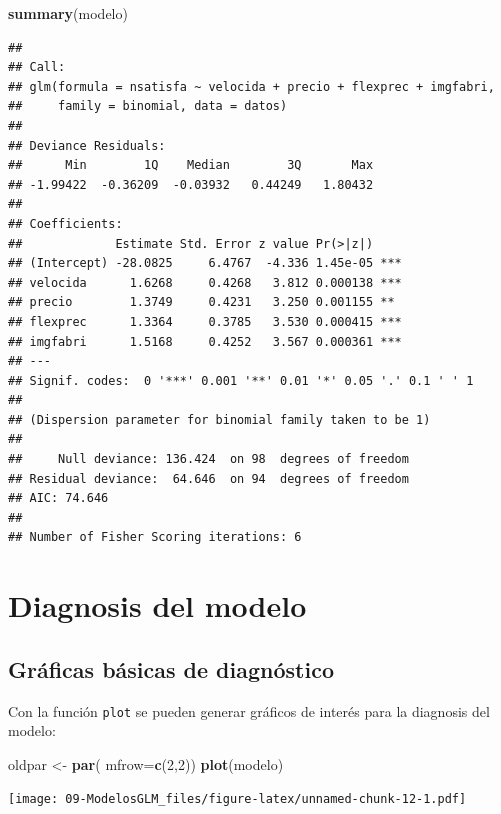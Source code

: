 \documentclass[]{book}
\newenvironment{Shaded}{\begin{snugshade}}{\end{snugshade}}
\newcommand{\KeywordTok}[1]{\textcolor[rgb]{0.13,0.29,0.53}{\textbf{#1}}}
\newcommand{\DataTypeTok}[1]{\textcolor[rgb]{0.13,0.29,0.53}{#1}}
\newcommand{\DecValTok}[1]{\textcolor[rgb]{0.00,0.00,0.81}{#1}}
\newcommand{\StringTok}[1]{\textcolor[rgb]{0.31,0.60,0.02}{#1}}
\newcommand{\NormalTok}[1]{#1}
\begin{document}
\begin{Shaded}
\begin{Highlighting}[]
\KeywordTok{summary}\NormalTok{(modelo)}
\end{Highlighting}
\end{Shaded}

\begin{verbatim}
## 
## Call:
## glm(formula = nsatisfa ~ velocida + precio + flexprec + imgfabri, 
##     family = binomial, data = datos)
## 
## Deviance Residuals: 
##      Min        1Q    Median        3Q       Max  
## -1.99422  -0.36209  -0.03932   0.44249   1.80432  
## 
## Coefficients:
##             Estimate Std. Error z value Pr(>|z|)    
## (Intercept) -28.0825     6.4767  -4.336 1.45e-05 ***
## velocida      1.6268     0.4268   3.812 0.000138 ***
## precio        1.3749     0.4231   3.250 0.001155 ** 
## flexprec      1.3364     0.3785   3.530 0.000415 ***
## imgfabri      1.5168     0.4252   3.567 0.000361 ***
## ---
## Signif. codes:  0 '***' 0.001 '**' 0.01 '*' 0.05 '.' 0.1 ' ' 1
## 
## (Dispersion parameter for binomial family taken to be 1)
## 
##     Null deviance: 136.424  on 98  degrees of freedom
## Residual deviance:  64.646  on 94  degrees of freedom
## AIC: 74.646
## 
## Number of Fisher Scoring iterations: 6
\end{verbatim}

\section{Diagnosis del modelo}\label{diagnosis-del-modelo-1}

\subsection{Gráficas básicas de
diagnóstico}\label{graficas-basicas-de-diagnostico-1}

Con la función \texttt{plot} se pueden generar gráficos de interés para
la diagnosis del modelo:

\begin{Shaded}
\begin{Highlighting}[]
\NormalTok{oldpar <-}\StringTok{ }\KeywordTok{par}\NormalTok{( }\DataTypeTok{mfrow=}\KeywordTok{c}\NormalTok{(}\DecValTok{2}\NormalTok{,}\DecValTok{2}\NormalTok{))}
\KeywordTok{plot}\NormalTok{(modelo)}
\end{Highlighting}
\end{Shaded}

\texttt{[image: 09-ModelosGLM\_files/figure-latex/unnamed-chunk-12-1.pdf]}
\end{document}
